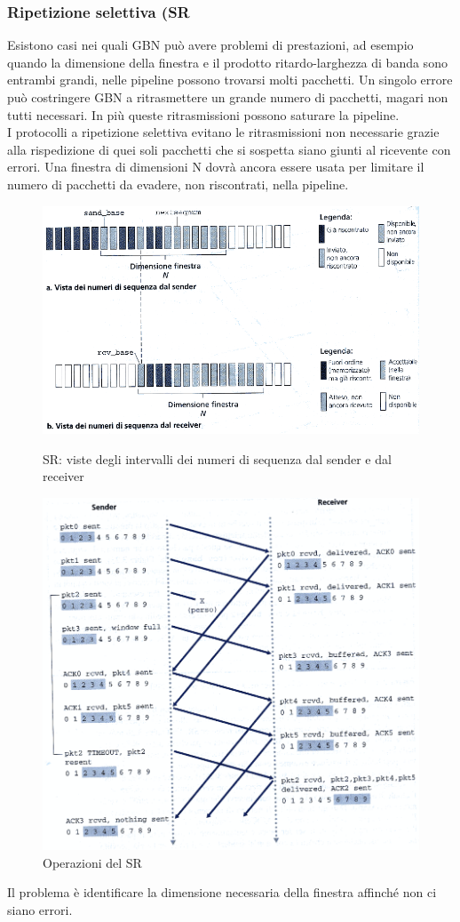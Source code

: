 \documentclass[11pt,a4paper]{article}
\begin{document}
\subsubsection{Ripetizione selettiva (SR}
Esistono casi nei quali GBN può avere problemi di prestazioni, ad esempio quando la dimensione della finestra e il prodotto ritardo-larghezza di banda sono entrambi grandi, nelle pipeline possono trovarsi molti pacchetti. Un singolo errore può costringere GBN a ritrasmettere un grande numero di pacchetti, magari non tutti necessari. In più queste ritrasmissioni possono saturare la pipeline. \\
I protocolli a ripetizione selettiva evitano le ritrasmissioni non necessarie grazie alla rispedizione di quei soli pacchetti che si sospetta siano giunti al ricevente con errori. Una finestra di dimensioni N dovrà ancora essere usata per limitare il numero di pacchetti da evadere, non riscontrati, nella pipeline.
\begin{figure}
	\includegraphics[scale=0.6]{img/028.png}
	\caption{SR: viste degli intervalli dei numeri di sequenza dal sender e dal receiver}
	\includegraphics[scale=0.6]{img/029.png}
	\caption{Operazioni del SR}
\end{figure}
Il problema è identificare la dimensione necessaria della finestra affinché non ci siano errori.
\pagebreak
\end{document}
